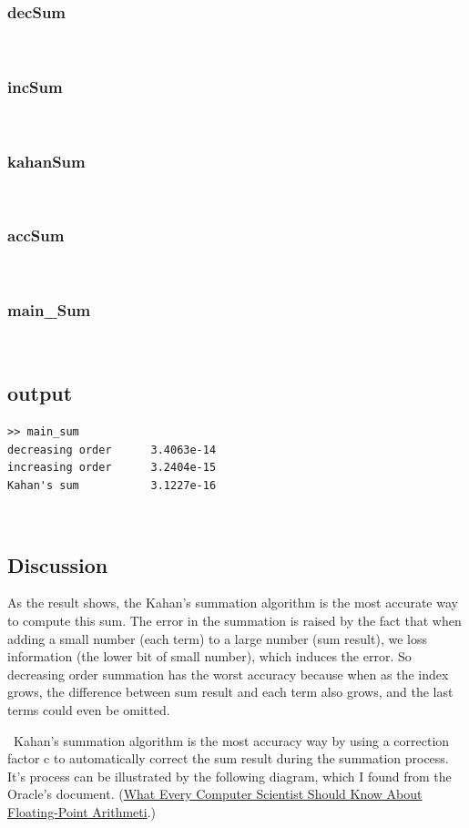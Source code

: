 \documentclass[11pt,fleqn]{exam}
\newcommand{\nn}{~\newline \noindent }
\begin{document}
\subsubsection*{decSum}


\nn
\subsubsection*{incSum}


\nn
\subsubsection*{kahanSum}


\nn
\subsubsection*{accSum}


\nn
\subsubsection*{main\_Sum}


\nn
\subsection*{output}
\lstset{language=bash}
\begin{lstlisting}
>> main_sum
decreasing order      3.4063e-14
increasing order      3.2404e-15
Kahan's sum           3.1227e-16
\end{lstlisting}

\nn
\subsection*{Discussion}
As the result shows, the Kahan's summation algorithm is the most accurate way to compute this sum.  The error in the summation is raised by the fact that when adding a small number (each term) to a large number (sum result),  we loss information (the lower bit of small number), which induces the error. So decreasing order summation has the worst accuracy because when as the index grows, the difference between sum result and each term also grows, and the last terms could even be omitted. 

\nn Kahan's summation algorithm is the most accuracy way by using a correction factor c to automatically correct the sum result during the summation process. It's process can be illustrated by the following diagram, which I found from the Oracle's document. (\href{https://docs.oracle.com/cd/E19957-01/806-3568/ncg_goldberg.html}{What Every Computer Scientist Should Know About Floating-Point Arithmeti}.)\\
\end{document}

